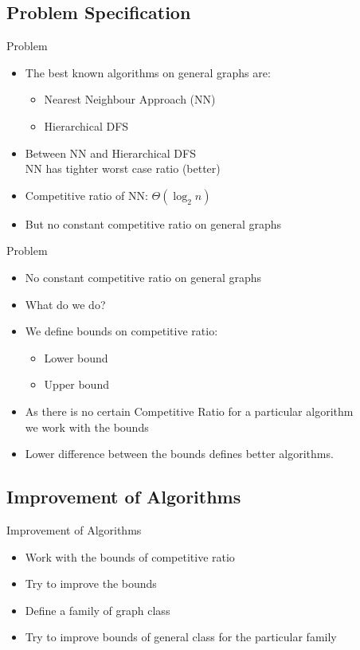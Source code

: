 \documentclass{beamer}
\begin{document}
\subsection{Problem Specification}
% 
\begin{frame}{Problem}
%  
% 
\begin{itemize}
%
\item {
    The best known algorithms on general graphs are:
    \begin{itemize}
        \item Nearest Neighbour Approach (NN)
        \item Hierarchical DFS
    \end{itemize}
} 
\item {
    Between {\color{red} NN} and {\color{red} Hierarchical DFS } \\
    {\color{ao(english)} NN} has tighter worst case ratio (better)
}
\item{
    Competitive ratio of NN: $\Theta\left(\log_{2}n\right)$
} 
\item{
    But no constant competitive ratio on general graphs
}
% 
% 
\end{itemize}
%
\end{frame}
%  
% 
\begin{frame}{Problem}
%  
%
\begin{itemize}
%
\item{
    \color{red} No constant competitive ratio on general graphs
}
% 
\item{
    \color{orange}What do we do?
}
% 
\item{
We define bounds on competitive ratio:
% 
\begin{itemize}
    \item Lower bound
    \item Upper bound
\end{itemize}
}
% 
\item{
    As there is no certain Competitive Ratio for a particular algorithm \\
    we work with the bounds
}
% 
\item{
    Lower difference between the bounds defines better algorithms.
}
% 
\end{itemize}
%
% 
% 
\end{frame}
% 
% 
% 
\subsection{Improvement of Algorithms}
% 
\begin{frame}{Improvement of Algorithms}
%  
%
\begin{itemize}
% 
\item Work with the bounds of competitive ratio
% 
\item Try to improve the bounds
% 
\item Define a family of graph class
% 
\item Try to improve bounds of general class for the particular family
% 
% 
\end{itemize}
%
% 
% 
\end{frame}
% 
% 
% 
\end{document}
